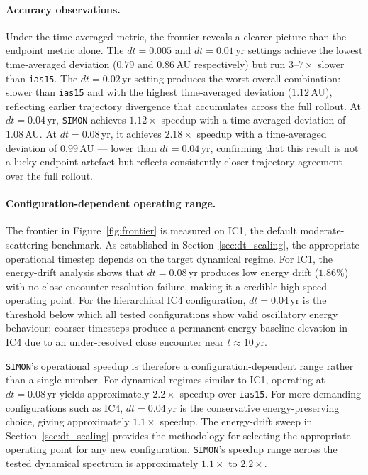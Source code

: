 \documentclass[12pt]{article}
\begin{document}
\paragraph{Accuracy observations.}
Under the time-averaged metric, the frontier reveals a clearer picture
than the endpoint metric alone. The $dt=0.005$ and $dt=0.01$\,yr
settings achieve the lowest time-averaged deviation ($0.79$ and
$0.86$\,AU respectively) but run $3$--$7\times$ slower than
\texttt{ias15}. The $dt=0.02$\,yr setting produces the worst overall
combination: slower than \texttt{ias15} and with the highest
time-averaged deviation ($1.12$\,AU), reflecting earlier trajectory
divergence that accumulates across the full rollout. At $dt=0.04$\,yr,
\texttt{SIMON} achieves $1.12\times$ speedup with a time-averaged
deviation of $1.08$\,AU. At $dt=0.08$\,yr, it achieves $2.18\times$
speedup with a time-averaged deviation of $0.99$\,AU --- lower than
$dt=0.04$\,yr, confirming that this result is not a lucky endpoint
artefact but reflects consistently closer trajectory agreement over
the full rollout.

\paragraph{Configuration-dependent operating range.}
The frontier in Figure~\ref{fig:frontier} is measured on IC1, the
default moderate-scattering benchmark. As established in
Section~\ref{sec:dt_scaling}, the appropriate operational timestep
depends on the target dynamical regime. For IC1, the energy-drift
analysis shows that $dt=0.08$\,yr produces low energy drift ($1.86\%$)
with no close-encounter resolution failure, making it a credible
high-speed operating point. For the hierarchical IC4 configuration,
$dt=0.04$\,yr is the threshold below which all tested configurations
show valid oscillatory energy behaviour; coarser timesteps produce a
permanent energy-baseline elevation in IC4 due to an under-resolved
close encounter near $t\approx10$\,yr.

\texttt{SIMON}'s operational speedup is therefore a
configuration-dependent range rather than a single number.
For dynamical regimes similar to IC1, operating at $dt=0.08$\,yr
yields approximately $\mathbf{2.2\times}$ speedup over
\texttt{ias15}. For more demanding configurations such as IC4,
$dt=0.04$\,yr is the conservative energy-preserving choice, giving
approximately $\mathbf{1.1\times}$ speedup. The energy-drift sweep in
Section~\ref{sec:dt_scaling} provides the methodology for selecting
the appropriate operating point for any new configuration.
\texttt{SIMON}'s speedup range across the tested dynamical spectrum
is approximately $\mathbf{1.1\times}$ to $\mathbf{2.2\times}$.
\end{document}
